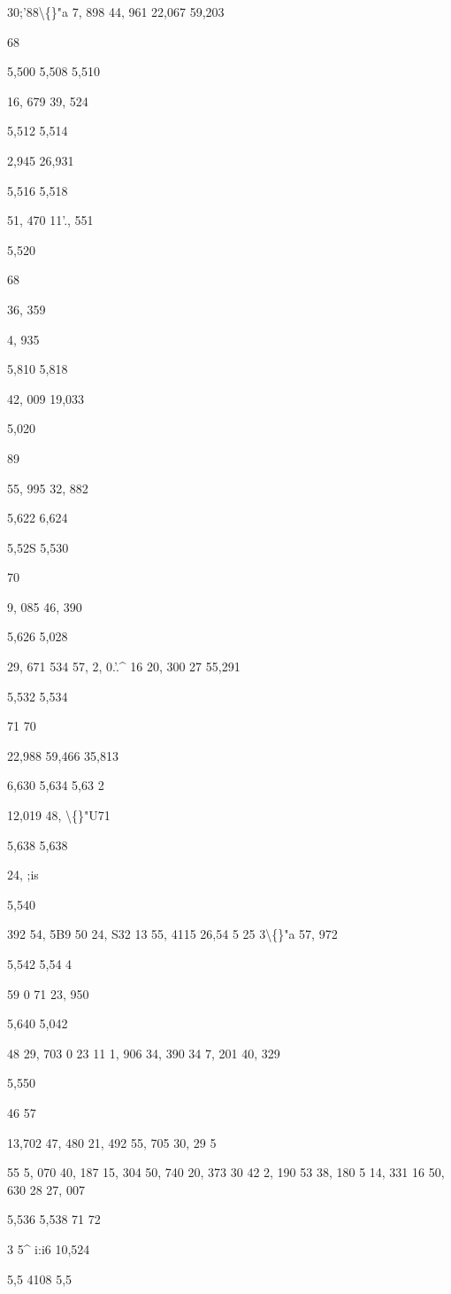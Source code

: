 \documentclass[10pt,a4paper]{article}
\begin{document}
30;'88\textbackslash\{\}"a
7, 898
44, 961
22,067
59,203

68

5,500
5,508
5,510

16, 679
39, 524

5,512
5,514

2,945
26,931

5,516
5,518

51, 470
11'., 551

5,520

68

36, 359

4, 935

5,810
5,818

42, 009
19,033

5,020

89

55, 995
32, 882

5,622
6,624

5,52S
5,530

70

9, 085
46, 390

5,626
5,028

29, 671
534 57,
2, 0.'.\textasciicircum{}
16 20, 300
27
55,291

5,532
5,534

71
70

22,988
59,466
35,813

6,630
5,634
5,63 2

12,019
48, \textbackslash\{\}"U71

5,638
5,638

24, ;is

5,540

392 54, 5B9
50
24, S32
13
55, 4115
26,54 5
25
3\textbackslash\{\}"a 57, 972

5,542
5,54 4

59 0 71
23, 950

5,640
5,042

48
29, 703
0
23
11
1, 906
34, 390
34
7, 201
40, 329

5,550

46
57

13,702
47, 480
21, 492
55, 705
30, 29 5

55
5, 070
40,
187
15, 304
50, 740
20, 373
30
42
2, 190
53
38, 180
5
14, 331
16
50, 630
28
27, 007

5,536
5,538
71
72

3 5\textasciicircum{} i:i6
10,524

5,5 4108
5,5
\end{document}
